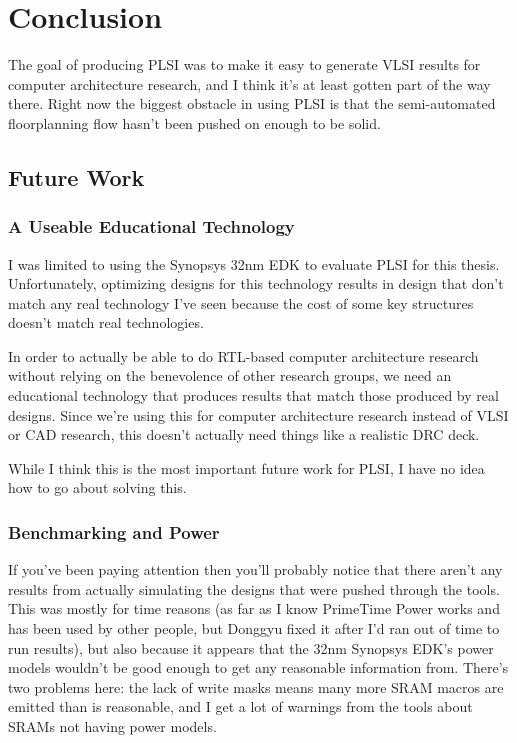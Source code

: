 \documentclass{article}
\begin{document}
\chapter{Conclusion}

The goal of producing PLSI was to make it easy to generate VLSI results for
computer architecture research, and I think it's at least gotten part of the
way there.  Right now the biggest obstacle in using PLSI is that the
semi-automated floorplanning flow hasn't been pushed on enough to be solid.

\section{Future Work}

\subsection{A Useable Educational Technology}

I was limited to using the Synopsys 32nm EDK to evaluate PLSI for this thesis.
Unfortunately, optimizing designs for this technology results in design that
don't match any real technology I've seen because the cost of some key
structures doesn't match real technologies.

In order to actually be able to do RTL-based computer architecture research
without relying on the benevolence of other research groups, we need an
educational technology that produces results that match those produced by real
designs.  Since we're using this for computer architecture research instead of
VLSI or CAD research, this doesn't actually need things like a realistic DRC
deck.

While I think this is the most important future work for PLSI, I have no idea how
to go about solving this.

\subsection{Benchmarking and Power}

If you've been paying attention then you'll probably notice that there aren't
any results from actually simulating the designs that were pushed through the
tools.  This was mostly for time reasons (as far as I know PrimeTime Power
works and has been used by other people, but Donggyu fixed it after I'd ran out
of time to run results), but also because it appears that the 32nm Synopsys
EDK's power models wouldn't be good enough to get any reasonable information
from.  There's two problems here: the lack of write masks means many more SRAM
macros are emitted than is reasonable, and I get a lot of warnings from the
tools about SRAMs not having power models.
\end{document}
